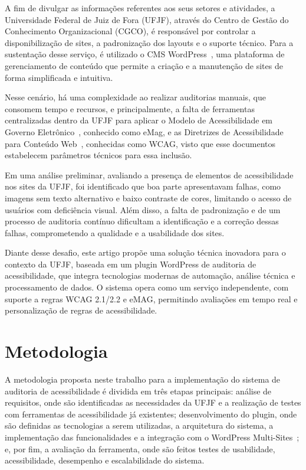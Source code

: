 \documentclass[
	article,			%
	12pt,				%
	oneside,			%
	a4paper,			%
	section=TITLE,		%
	subsection=TITLE,	%
	english,			%
	brazil,				%
	sumario=tradicional
	]{abntex2}
\begin{document}
A fim de divulgar as informações referentes aos seus setores e atividades, a
Universidade Federal de Juiz de Fora (UFJF), através do Centro de Gestão
do Conhecimento Organizacional (CGCO), é responsável por controlar a
disponibilização de sites, a padronização dos layouts e o suporte técnico. Para
a sustentação desse serviço, é utilizado o CMS WordPress~\cite{WP},
uma plataforma de gerenciamento de conteúdo que permite a criação e a 
manutenção de sites de forma simplificada e intuitiva.

Nesse cenário, há uma complexidade ao realizar auditorias manuais, que
consomem tempo e recursos, e principalmente, a falta de ferramentas
centralizadas dentro da UFJF para aplicar o Modelo de Acessibilidade em
Governo Eletrônico~\cite{emag}, conhecido como eMag, e as Diretrizes
de Acessibilidade para Conteúdo Web~\cite{wcag22}, conhecidas como
WCAG, visto que esse documentos estabelecem parâmetros técnicos para essa inclusão.

Em uma análise preliminar, avaliando a presença de elementos de acessibilidade nos
sites da UFJF, foi identificado que boa parte apresentavam falhas, como imagens sem texto
alternativo e baixo contraste de cores, limitando o acesso de usuários com deficiência
visual. Além disso, a falta de padronização e de um processo de auditoria contínuo
dificultam a identificação e a correção dessas falhas, comprometendo a qualidade e a
usabilidade dos sites.

Diante desse desafio, este artigo propõe uma solução técnica inovadora
para o contexto da UFJF, baseada em um plugin WordPress de auditoria
de acessibilidade, que integra tecnologias modernas de automação,
análise técnica e processamento de dados. O sistema opera como um serviço
independente, com suporte a regras WCAG 2.1/2.2 e eMAG, permitindo
avaliações em tempo real e personalização de regras de acessibilidade.

\section{Metodologia}\label{sec:metodologia}
A metodologia proposta neste trabalho
para a implementação do sistema de auditoria de acessibilidade é dividida
em três etapas principais: análise de requisitos, onde são identificadas as
necessidades da UFJF e a realização de testes com ferramentas de acessibilidade já
existentes; desenvolvimento do plugin, onde são definidas as tecnologias a serem
utilizadas, a arquitetura do sistema, a implementação das funcionalidades e a
integração com o WordPress Multi-Sites~\cite{wp-ms}; e, por fim,
a avaliação da ferramenta,
onde são feitos testes de usabilidade, acessibilidade, desempenho e
escalabilidade do sistema.
\end{document}
